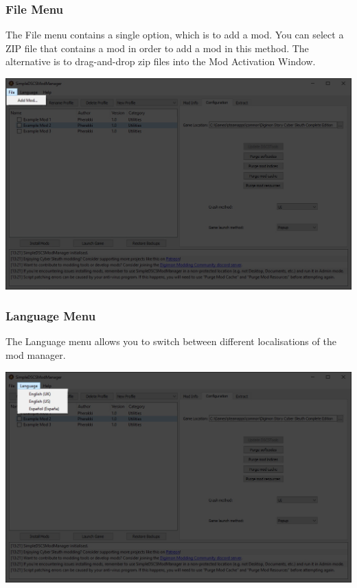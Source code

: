 \documentclass{article}
\begin{document}
\subsubsection{File Menu}
The File menu contains a single option, which is to add a mod. You can select a ZIP file that contains a mod in order to add a mod in this method. The alternative is to drag-and-drop zip files into the Mod Activation Window.
\begin{center}
  \includegraphics[scale=0.4]{img/modmanager_ui_filemenu.jpg}
\end{center}

\newpage

\subsubsection{Language Menu}
The Language menu allows you to switch between different localisations of the mod manager.
\begin{center}
  \includegraphics[scale=0.4]{img/modmanager_ui_languagemenu.jpg}
\end{center}
\end{document}
